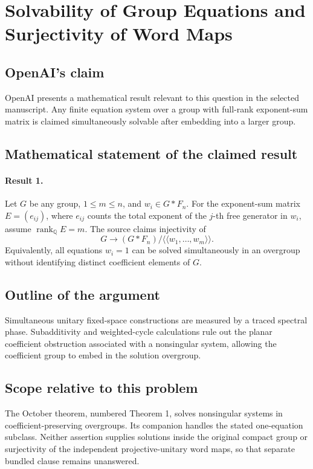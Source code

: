 \documentclass[11pt]{article}
\begin{document}
\section*{Solvability of Group Equations and Surjectivity of Word Maps}

\subsection{OpenAI's claim}
OpenAI presents a mathematical result relevant to this question in the selected manuscript. Any finite equation system over a group with full-rank exponent-sum matrix is claimed simultaneously solvable after embedding into a larger group.

\subsection{Mathematical statement of the claimed result}
\paragraph{Result 1.} Let \(G\) be any group, \(1\le m\le n\), and \(w_i\in G*F_n\). For the exponent-sum matrix \(E=(e_{ij})\), where \(e_{ij}\) counts the total exponent of the \(j\)-th free generator in \(w_i\), assume \(\operatorname{rank}_{\mathbb Q}E=m\). The source claims injectivity of
\[
 G\longrightarrow (G*F_n)/\langle\!\langle w_1,\ldots,w_m\rangle\!\rangle.
\]
Equivalently, all equations \(w_i=1\) can be solved simultaneously in an overgroup without identifying distinct coefficient elements of \(G\).

\subsection{Outline of the argument}
Simultaneous unitary fixed-space constructions are measured by a traced spectral phase. Subadditivity and weighted-cycle calculations rule out the planar coefficient obstruction associated with a nonsingular system, allowing the coefficient group to embed in the solution overgroup.

\subsection{Scope relative to this problem}
The October theorem, numbered Theorem 1, solves nonsingular systems in coefficient-preserving overgroups. Its companion handles the stated one-equation subclass. Neither assertion supplies solutions inside the original compact group or surjectivity of the independent projective-unitary word maps, so that separate bundled clause remains unanswered.
\end{document}
